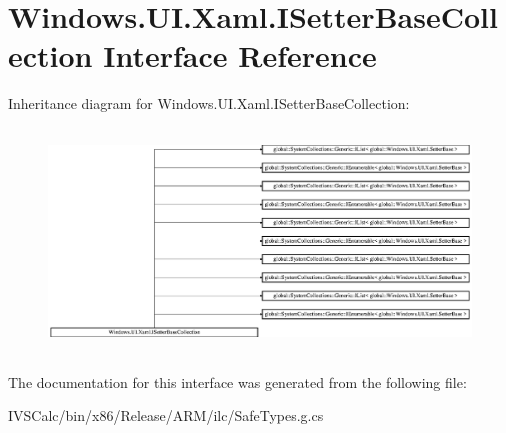 \hypertarget{interface_windows_1_1_u_i_1_1_xaml_1_1_i_setter_base_collection}{}\section{Windows.\+U\+I.\+Xaml.\+I\+Setter\+Base\+Collection Interface Reference}
\label{interface_windows_1_1_u_i_1_1_xaml_1_1_i_setter_base_collection}
Inheritance diagram for Windows.\+U\+I.\+Xaml.\+I\+Setter\+Base\+Collection\+:\begin{figure}[H]
\begin{center}
\leavevmode
\includegraphics[height=5.980582cm]{interface_windows_1_1_u_i_1_1_xaml_1_1_i_setter_base_collection}
\end{center}
\end{figure}


The documentation for this interface was generated from the following file\+:\begin{DoxyCompactItemize}
\item 
I\+V\+S\+Calc/bin/x86/\+Release/\+A\+R\+M/ilc/Safe\+Types.\+g.\+cs\end{DoxyCompactItemize}
